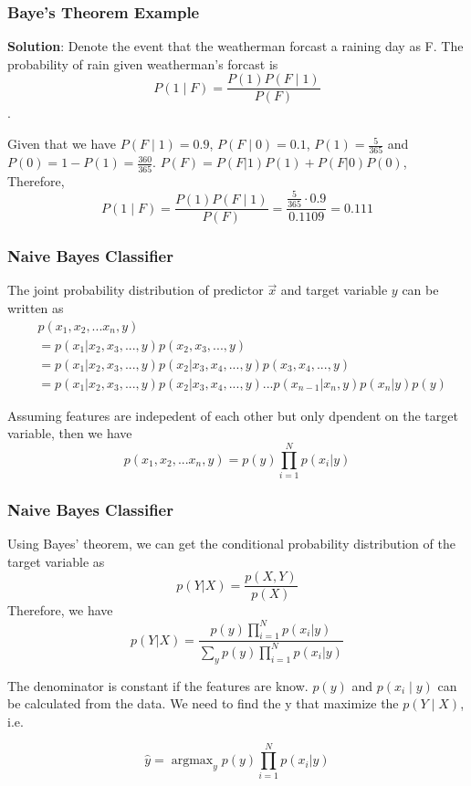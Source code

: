 \documentclass[notheorems, aspectratio=54, tikz,border=10pt,multi]{beamer}
\DeclareMathOperator*{\argmax}{argmax} %
\begin{document}
\begin{frame}
\frametitle{Baye's Theorem Example}
\textbf{Solution}: Denote the event that the weatherman forcast a raining day as F. The probability of rain given weatherman's forcast is $$P(1 \mid F)=\frac{P(1)P(F\mid 1)}{P(F)}$$. 

Given that we have $P(F \mid 1)=0.9$, $P(F\mid 0)=0.1$, $P(1)=\frac{5}{365}$ and $P(0)=1-P(1)= \frac{360}{365}$. $P(F)=P(F|1)P(1)+P(F|0)P(0)$,
Therefore, 
$$P(1 \mid F)=\frac{P(1)P(F\mid 1)}{P(F)}=\frac{\frac{5}{365}\cdot0.9}{0.1109}=0.111$$


\end{frame}

\begin{frame}
\frametitle{Naive Bayes Classifier}
The joint probability distribution of predictor $\vec{x}$ and target variable $y$ can be written as
\begin{align*}
&p(x_1, x_2, ...x_n, y)\\
&=p(x_1|x_2, x_3, ..., y)p(x_2, x_3, ..., y)\\
&=p(x_1|x_2, x_3, ..., y)p(x_2|x_3, x_4, ..., y)p(x_3, x_4, ..., y)\\
&=p(x_1|x_2, x_3, ..., y)p(x_2|x_3, x_4, ..., y)...p(x_{n-1}|x_n, y)p(x_n|y)p(y)
\end{align*}


Assuming features are indepedent of each other but only dpendent on the target variable, then we have
$$
p(x_1, x_2, ...x_n, y)=p(y)\prod\limits_{i=1}^{N}p(x_i|y)
$$
\end{frame}


\begin{frame}
    \frametitle{Naive Bayes Classifier}
Using Bayes' theorem, we can get the conditional probability distribution of the target variable as
$$
p(Y|X)=\frac{p(X,Y)}{p(X)}
$$
Therefore, we have 
$$
p(Y|X)=\frac{p(y)\prod\limits_{i=1}^{N}p(x_i|y)}{\sum\limits_{y}p(y)\prod\limits_{i=1}^{N}p(x_i|y)}
$$

The denominator is constant if the features are know. $p(y)$ and $p(x_i\mid y)$ can be calculated from the data. We need to find the y that maximize the $p(Y\mid X)$, i.e.

$$
\hat{y}=\argmax_{y}p(y)\prod\limits_{i=1}^{N}p(x_i|y)
$$

\end{frame}

\section{}
\end{document}
